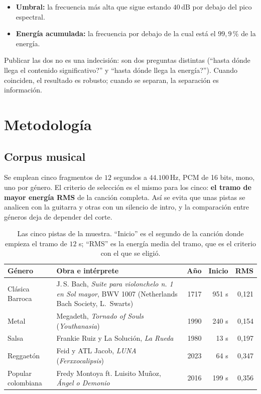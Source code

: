 \documentclass[11pt,a4paper]{article}
\newcommand{\dB}{\,\mathrm{dB}}
\newcommand{\Hz}{\,\mathrm{Hz}}
\begin{document}
\begin{itemize}
  \item \textbf{Umbral:} la frecuencia más alta que sigue estando \(40\dB\) por
        debajo del pico espectral.
  \item \textbf{Energía acumulada:} la frecuencia por debajo de la cual está el
        \(99{,}9\)\,\% de la energía.
\end{itemize}

Publicar las dos no es una indecisión: son dos preguntas distintas
(``\textquestiondown{}hasta dónde llega el contenido significativo?'' y ``\textquestiondown{}hasta dónde llega la
energía?''). Cuando coinciden, el resultado es robusto; cuando se separan,
la separación es información.

\section{Metodología}\label{sec:metodo}

\subsection{Corpus musical}

Se emplean cinco fragmentos de \(12\) segundos a \(44.100\Hz\), PCM de 16
bits, mono, uno por género. El criterio de selección es el mismo para los
cinco: \textbf{el tramo de mayor energía RMS} de la canción completa. Así se
evita que unas pistas se analicen con la guitarra y otras con un silencio de
intro, y la comparación entre géneros deja de depender del corte.

\begin{table}[H]
\centering
\small
\begin{tabularx}{\linewidth}{@{}l >{\raggedright\arraybackslash}X r r r@{}}
\toprule
\textbf{Género} & \textbf{Obra e intérprete} & \textbf{Año} &
\textbf{Inicio} & \textbf{RMS} \\
\midrule
Clásica\,\textperiodcentered{}\,Barroca & J.\,S. Bach, \emph{Suite para violonchelo n.\textordmasculine{} 1 en Sol
mayor}, BWV 1007 (Netherlands Bach Society, L.~Swarts) & 1717 & 951 s & 0,121 \\
Metal & Megadeth, \emph{Tornado of Souls} (\emph{Youthanasia}) & 1990 &
240 s & 0,154 \\
Salsa & Frankie Ruiz y La Solución, \emph{La Rueda} & 1980 & 13 s & 0,197 \\
Reggaetón & Feid y ATL Jacob, \emph{LUNA} (\emph{Ferxxocalipsis}) & 2023 &
64 s & 0,347 \\
Popular colombiana & Fredy Montoya ft. Luisito Muñoz, \emph{Ángel o Demonio}
& 2016 & 199 s & 0,356 \\
\bottomrule
\end{tabularx}
\caption{Las cinco pistas de la muestra. ``Inicio'' es el segundo de la
canción donde empieza el tramo de \(12\) s; ``RMS'' es la energía media del
tramo, que es el criterio con el que se eligió.}
\label{tab:corpus}
\end{table}
\end{document}
